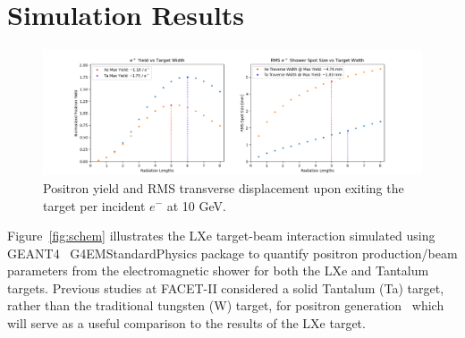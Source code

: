 \documentclass[
reprint,
nofootinbib,
amsmath, amssymb,
aps,
floatfix,
]{revtex4-2}
\begin{document}
\section{Simulation Results}





\begin{figure}
    \includegraphics[width = \linewidth]{../images/CompYS.png}
    \caption{\label{fig:Yield} Positron yield and RMS transverse displacement upon exiting the target 
    per incident $e^-$ at 10 GeV.}
\end{figure}

Figure~\ref{fig:schem} illustrates the LXe target-beam interaction simulated using GEANT4~\cite{Geant4} G4EMStandardPhysics package to quantify positron production/beam parameters from the electromagnetic shower for both the LXe and Tantalum targets.  Previous studies at FACET-II considered a solid Tantalum (Ta) target, rather than the traditional tungsten (W) target, for positron generation~\cite{Fujii2019} which will serve as a useful comparison to the results of the LXe target.
\end{document}
